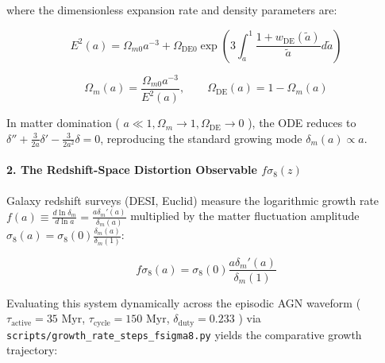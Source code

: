 \documentclass[11pt,a4paper]{article}
\theoremstyle{definition}\newtheorem{definition}{Definition}
\theoremstyle{remark}\newtheorem{remark}{Remark}
\begin{document}
where the dimensionless expansion rate and density parameters are:


\begin{equation}
E^2(a) = \Omega_{m0} a^{-3} + \Omega_{\text{DE}0} \exp\left( 3 \int_a^1 \frac{1 + w_{\text{DE}}(\tilde{a})}{\tilde{a}} d\tilde{a} \right)
\end{equation}



\begin{equation}
\Omega_m(a) = \frac{\Omega_{m0} a^{-3}}{E^2(a)}, \qquad \Omega_{\text{DE}}(a) = 1 - \Omega_m(a)
\end{equation}


In matter domination ( $a \ll 1, \Omega_m \to 1, \Omega_{\text{DE}} \to 0$ ), the ODE reduces to $\delta'' + \frac{3}{2a}\delta' - \frac{3}{2a^2}\delta = 0$, reproducing the standard growing mode $\delta_m(a) \propto a$.
\paragraph{2. The Redshift-Space Distortion Observable $f\sigma_8(z)$}

Galaxy redshift surveys (DESI, Euclid) measure the logarithmic growth rate $f(a) \equiv \frac{d\ln\delta_m}{d\ln a} = \frac{a \delta_m'(a)}{\delta_m(a)}$ multiplied by the matter fluctuation amplitude $\sigma_8(a) = \sigma_8(0) \frac{\delta_m(a)}{\delta_m(1)}$:


\begin{equation}
\boxed{f\sigma_8(a) = \sigma_8(0) \frac{a \delta_m'(a)}{\delta_m(1)}}
\end{equation}


Evaluating this system dynamically across the episodic AGN waveform ( $\tau_{\text{active}} = 35\text{ Myr}$, $\tau_{\text{cycle}} = 150\text{ Myr}$, $\delta_{\text{duty}} = 0.233$ ) via \texttt{scripts/growth_rate_steps_fsigma8.py} yields the comparative growth trajectory:
\end{document}
